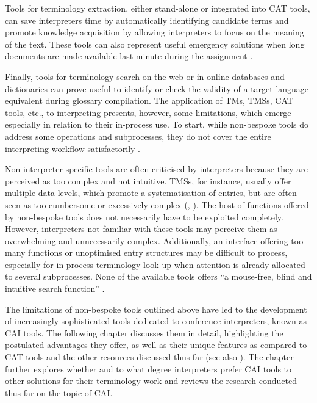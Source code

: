 Tools for terminology extraction, either stand-alone or integrated into CAT tools, can save interpreters time by automatically identifying candidate terms and promote knowledge acquisition by allowing interpreters to focus on the meaning of the text. These tools can also represent useful emergency solutions when long documents are made available last-minute during the assignment \citep[48]{rutten2012TM}.

Finally, tools for terminology search on the web or in online databases and dictionaries can prove useful to identify or check the validity of a target-language equivalent during glossary compilation.
The application of TMs, TMSs, CAT tools, etc., to interpreting presents, however, some limitations, which emerge especially in relation to their in-process use. To start, while non-bespoke tools do address some operations and subprocesses, they do not cover the entire interpreting workflow satisfactorily \citep[49]{rutten2013TM}.

Non-interpreter-specific tools are often criticised by interpreters because they are perceived as too complex and not intuitive. TMSs, for instance, usually offer multiple data levels, which promote a systematisation of entries, but are often seen as too cumbersome or excessively complex (\citealt[50]{rutten2012TM}, \citealt[141]{stoll_jenseits_2009}).
The host of functions offered by non-bespoke tools does not necessarily have to be exploited completely. However, interpreters not familiar with these tools may perceive them as overwhelming and unnecessarily complex.
Additionally, an interface offering too many functions or unoptimised entry structures may be difficult to process, especially for in-process terminology look-up when attention is already allocated to several subprocesses. None of the available tools offers ``a mouse-free, blind and intuitive search function'' \citep[46]{rutten2012TM}.

The limitations of non-bespoke tools outlined above have led to the development of increasingly sophisticated tools dedicated to conference interpreters, known as CAI tools. The following chapter discusses them in detail, highlighting the postulated advantages they offer, as well as their unique features as compared to CAT tools and the other resources discussed thus far (see also ). The chapter further explores whether and to what degree interpreters prefer CAI tools to other solutions for their terminology work and reviews the research conducted thus far on the topic of CAI.
